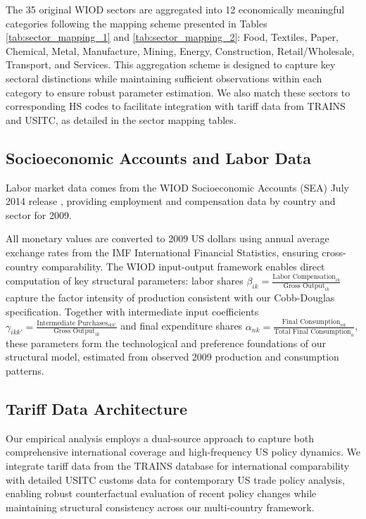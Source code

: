 The 35 original WIOD sectors are aggregated into 12 economically meaningful categories following the mapping scheme presented in Tables \ref{tab:sector_mapping_1} and \ref{tab:sector_mapping_2}: Food, Textiles, Paper, Chemical, Metal, Manufacture, Mining, Energy, Construction, Retail/Wholesale, Transport, and Services. This aggregation scheme is designed to capture key sectoral distinctions while maintaining sufficient observations within each category to ensure robust parameter estimation. We also match these sectors to corresponding HS codes to facilitate integration with tariff data from TRAINS and USITC, as detailed in the sector mapping tables.





\subsection{Socioeconomic Accounts and Labor Data}

Labor market data comes from the WIOD Socioeconomic Accounts (SEA) July 2014 release \citep{timmer2015illustrated}, providing employment and compensation data by country and sector for 2009. 

All monetary values are converted to 2009 US dollars using annual average exchange rates from the IMF International Financial Statistics, ensuring cross-country comparability. The WIOD input-output framework enables direct computation of key structural parameters: labor shares $\beta_{ik} = \frac{\text{Labor Compensation}_{ik}}{\text{Gross Output}_{ik}}$ capture the factor intensity of production consistent with our Cobb-Douglas specification. Together with intermediate input coefficients $\gamma_{ikk'} = \frac{\text{Intermediate Purchases}_{ikk'}}{\text{Gross Output}_{ik}}$ and final expenditure shares $\alpha_{nk} = \frac{\text{Final Consumption}_{nk}}{\text{Total Final Consumption}_{n}}$, these parameters form the technological and preference foundations of our structural model, estimated from observed 2009 production and consumption patterns.

\subsection{Tariff Data Architecture}

Our empirical analysis employs a dual-source approach to capture both comprehensive international coverage and high-frequency US policy dynamics. We integrate tariff data from the TRAINS database for international comparability with detailed USITC customs data for contemporary US trade policy analysis, enabling robust counterfactual evaluation of recent policy changes while maintaining structural consistency across our multi-country framework.

